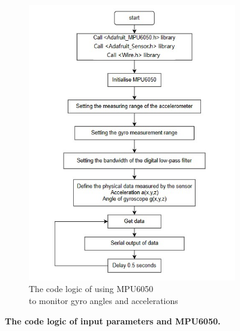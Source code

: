 \begin{landscape}
\begin{figure}[H]
\begin{subfigure}{0.62\textwidth}
            \includegraphics[width=\linewidth]{Image/Design/code_logic_angle.jpg}
            \caption{\centering The code logic of using MPU6050 \\to monitor gyro angles and accelerations}
            \label{fig:cl_angle}
        \end{subfigure}
        \caption[]
        {\centering \textbf{The code logic of input parameters and MPU6050.}}
        \label{fig:cl_input_angle}
    \end{figure}
\end{landscape}
\newpage
